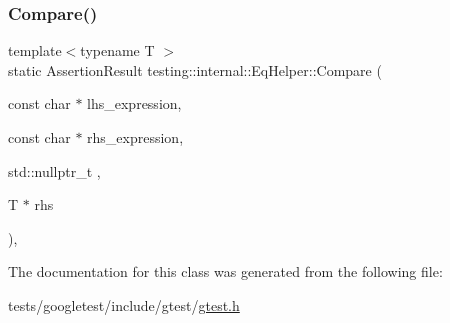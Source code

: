 \mbox{\label{classtesting_1_1internal_1_1EqHelper_af5cac2c28545dfa0688849e205f54bec}} 
\subsubsection{\texorpdfstring{Compare()}{Compare()}\hspace{0.1cm}{\footnotesize\ttfamily [3/3]}}
{\footnotesize\ttfamily template$<$typename T $>$ \\
static Assertion\+Result testing\+::internal\+::\+Eq\+Helper\+::\+Compare (\begin{DoxyParamCaption}\item[{const char $\ast$}]{lhs\+\_\+expression,  }\item[{const char $\ast$}]{rhs\+\_\+expression,  }\item[{std\+::nullptr\+\_\+t}]{,  }\item[{T $\ast$}]{rhs }\end{DoxyParamCaption})\hspace{0.3cm}{\ttfamily [inline]}, {\ttfamily [static]}}



The documentation for this class was generated from the following file\+:\begin{DoxyCompactItemize}
\item 
tests/googletest/include/gtest/\hyperlink{gtest_8h}{gtest.\+h}\end{DoxyCompactItemize}
